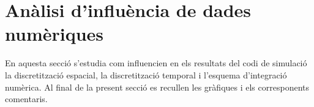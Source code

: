 
\section{Anàlisi d'influència de dades numèriques}

En aquesta secció s'estudia com influencien en els resultats del codi de simulació la discretització espacial, la discretització temporal i l'esquema d'integració numèrica. Al final de la present secció es recullen les gràfiques i els corresponents comentaris.





